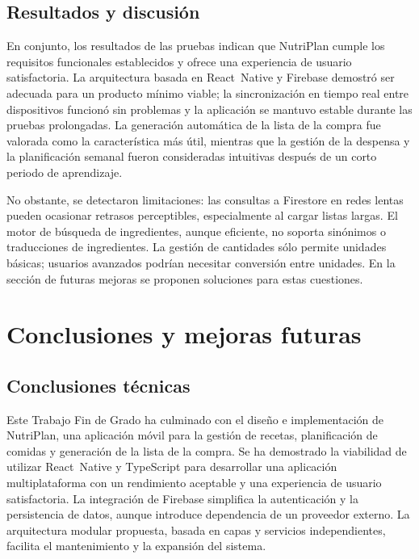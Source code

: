 \documentclass[twoside, openright, 11pt]{report}
\begin{document}
\section{Resultados y discusión}
En conjunto, los resultados de las pruebas indican que NutriPlan cumple los requisitos funcionales establecidos y ofrece una experiencia de usuario satisfactoria. La arquitectura basada en React Native y Firebase demostró ser adecuada para un producto mínimo viable; la sincronización en tiempo real entre dispositivos funcionó sin problemas y la aplicación se mantuvo estable durante las pruebas prolongadas. La generación automática de la lista de la compra fue valorada como la característica más útil, mientras que la gestión de la despensa y la planificación semanal fueron consideradas intuitivas después de un corto periodo de aprendizaje.

No obstante, se detectaron limitaciones: las consultas a Firestore en redes lentas pueden ocasionar retrasos perceptibles, especialmente al cargar listas largas. El motor de búsqueda de ingredientes, aunque eficiente, no soporta sinónimos o traducciones de ingredientes. La gestión de cantidades sólo permite unidades básicas; usuarios avanzados podrían necesitar conversión entre unidades. En la sección de futuras mejoras se proponen soluciones para estas cuestiones.

\chapter{Conclusiones y mejoras futuras}
\label{cap.conclusiones}

\section{Conclusiones técnicas}
Este Trabajo Fin de Grado ha culminado con el diseño e implementación de NutriPlan, una aplicación móvil para la gestión de recetas, planificación de comidas y generación de la lista de la compra. Se ha demostrado la viabilidad de utilizar React Native y TypeScript para desarrollar una aplicación multiplataforma con un rendimiento aceptable y una experiencia de usuario satisfactoria. La integración de Firebase simplifica la autenticación y la persistencia de datos, aunque introduce dependencia de un proveedor externo. La arquitectura modular propuesta, basada en capas y servicios independientes, facilita el mantenimiento y la expansión del sistema.
\end{document}
